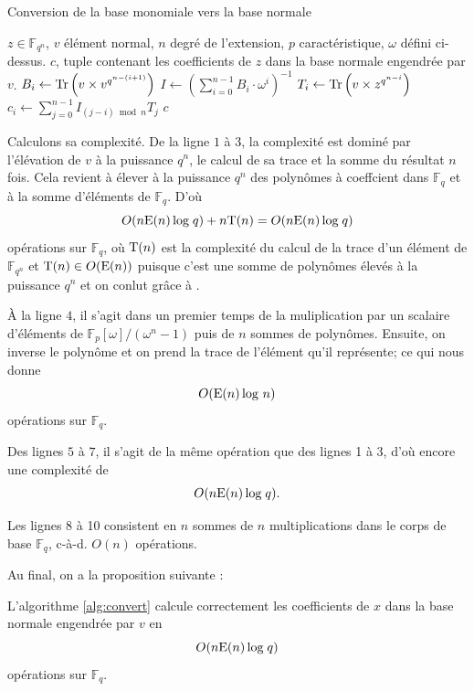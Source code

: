 \documentclass[a4paper]{article} %
\numberwithin{section}{part}
\numberwithin{equation}{section}
\newcommand\GF[1]{\mathbb{F}_{#1}}
\newcommand\Tr[1]{\textup{Tr}\left(#1\right)}
\newcommand\E[1]{\textup{E}(#1)}
\begin{document}
\begin{algorithm}
\caption{Conversion de la base monomiale vers la base normale}
\label{alg:convert}
\begin{algorithmic}[1]
\REQUIRE $z\in\GF{q^n}$, $v$ élément normal, $n$ degré de l'extension, $p$ 
caractéristique, $\omega$ défini ci-dessus.
\ENSURE $c$, tuple contenant les coefficients de $z$ dans la base 
normale engendrée par $v$.
\bigskip
{}
    \STATE $B_i \leftarrow \Tr{v\times v^{q^{n-(i+1)}}}$
\ENDFOR
\STATE $I \leftarrow (\sum_{i = 0}^{n-1}{B_i\cdot \omega^i})^{-1}$
    \STATE $T_i \leftarrow \Tr{v\times z^{q^{n-i}}}$
\ENDFOR
{}
    \STATE $c_i \leftarrow \sum_{j=0}^{n-1}{I_{(j-i)\bmod n}T_j}$
\ENDFOR
\RETURN $c$

\end{algorithmic}
\end{algorithm}
Calculons sa complexité. De la ligne $1$ à $3$, la complexité est dominé par 
l'élévation de $v$ à la puissance $q^n$, le calcul de sa trace et la somme du 
résultat $n$ fois. Cela revient à élever à la puissance $q^n$ des polynômes à 
coeffcient dans $\GF{q}$ et à la somme d'éléments de $\GF{q}$. D'où 
\begin{equation}
O(n\E{n}\,\textup{log}\;q) + n\textup{T}(n) = O(n\E{n}\,\textup{log}\;q) 
\end{equation}
opérations sur $\GF{q}$, où $\textup{T}(n)$ est la complexité du calcul de la 
trace d'un élément de $\GF{q^n}$ et $\textup{T}(n) \in O(\E{n})$ puisque c'est
une somme de polynômes élevés à la puissance $q^n$ et on conlut grâce à
\cite{GaoGaPaSho}.\par
À la ligne $4$, il s'agit dans un premier temps de la muliplication par un 
scalaire d'éléments de $\mathbb{F}_p[\omega]/(\omega^n - 1)$ puis de $n$ sommes 
de polynômes. Ensuite, on inverse le polynôme et on prend la trace de l'élément 
qu'il représente; ce qui nous donne 
\begin{equation}
O(\E{n}\,\textup{log }n)
\end{equation}
opérations sur $\GF{q}$.\par
Des lignes $5$ à $7$, il s'agit de la même opération que des lignes 1 à 3, d'où 
encore une complexité de 
\begin{equation}
O(n\E{n}\,\textup{log}\;q).
\end{equation}

Les lignes 8 à 10 consistent en $n$ sommes de $n$ multiplications dans le corps 
de base $\GF{q}$, c-à-d. $O(n)$ opérations.\par
Au final, on a la proposition suivante :
\begin{prop}
\label{prop:algconvert}
L'algorithme \ref{alg:convert} calcule correctement les coefficients de $x$ dans
la base normale engendrée par $v$ en
\begin{equation}
O(n\E{n}\,\textup{log}\;q)
\end{equation}
opérations sur $\GF{q}$.
\end{prop}
\end{document}
